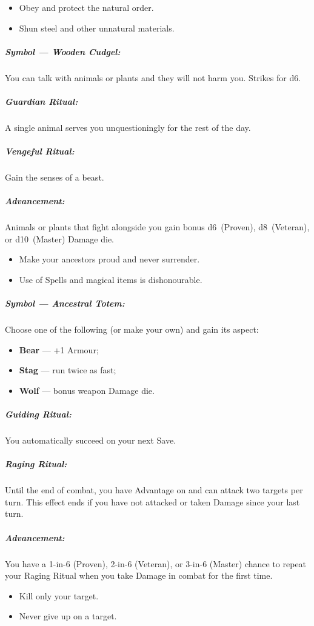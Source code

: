 \documentclass[itdr/core]{subfiles}
\begin{document}
\vfill

{\em\begin{itemize}
		\item Obey and protect the natural order.
		\item Shun steel and other unnatural materials.
\end{itemize}}

\subparagraph{Symbol --- Wooden Cudgel:} You can talk with animals or plants and they will not harm you. Strikes for d6.

\subparagraph{Guardian Ritual:} A single animal serves you unquestioningly for the rest of the day.

\subparagraph{Vengeful Ritual:} Gain the senses of a beast.

\subparagraph{Advancement:} Animals or plants that fight alongside you gain bonus d6~(Proven), d8~(Veteran), or d10~(Master) Damage die.

\vfill

{\em\begin{itemize}
		\item Make your ancestors proud and never surrender.
		\item Use of Spells and magical items is dishonourable.
\end{itemize}}

\subparagraph{Symbol --- Ancestral Totem:} Choose one of the following (or make your own) and gain its aspect:
\begin{itemize}
	\item \textbf{Bear} --- +1 Armour;
	\item \textbf{Stag} --- run twice as fast;
	\item \textbf{Wolf} --- bonus weapon Damage die.
\end{itemize}

\subparagraph{Guiding Ritual:} You automatically succeed on your next Save.

\subparagraph{Raging Ritual:} Until the end of combat, you have Advantage on  and can attack two targets per turn. This effect ends if you have not attacked or taken Damage since your last turn.

\subparagraph{Advancement:} You have a 1-in-6 (Proven), 2-in-6 (Veteran), or 3-in-6 (Master) chance to repeat your Raging Ritual when you take Damage in combat for the first time.

\break

{\em\begin{itemize}
		\item Kill only your target.
		\item Never give up on a target.
\end{itemize}}
\end{document}
